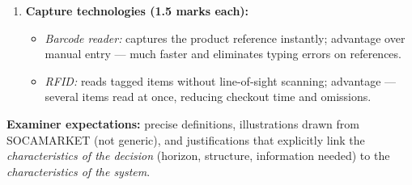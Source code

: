 \documentclass[11pt]{article}
\begin{document}
\begin{corrige}
\begin{enumerate}
\begin{itemize}
\item \emph{Strategic $\to$ ESS:} the Executive Support System aggregates internal summaries with external market data and presents trends graphically, suiting long-term, weakly structured decisions. (A DSS would be accepted for the tactical decision if justified by simulation of promotion scenarios.)
\end{itemize}
\item \textbf{Capture technologies (1.5 marks each):}
\begin{itemize}
\item \emph{Barcode reader:} captures the product reference instantly; advantage over manual entry — much faster and eliminates typing errors on references.
\item \emph{RFID:} reads tagged items without line-of-sight scanning; advantage — several items read at once, reducing checkout time and omissions.
\end{itemize}
\end{enumerate}
\textbf{Examiner expectations:} precise definitions, illustrations drawn from SOCAMARKET (not generic), and justifications that explicitly link the \emph{characteristics of the decision} (horizon, structure, information needed) to the \emph{characteristics of the system}.
\end{corrige}
\end{document}
